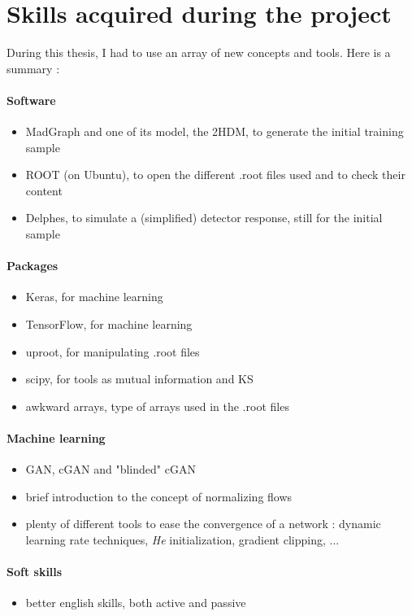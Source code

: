 \section{Skills acquired during the project}

During this thesis, I had to use an array of new concepts and tools. Here is a summary :

\paragraph{Software}
\begin{itemize}
    \item MadGraph and one of its model, the 2HDM, to generate the initial training sample
    \item ROOT (on Ubuntu), to open the different .root files used and to check their content
    \item Delphes, to simulate a (simplified) detector response, still for the initial sample
\end{itemize}

\paragraph{Packages}
\begin{itemize}
    \item Keras, for machine learning
    \item TensorFlow, for machine learning
    \item uproot, for manipulating .root files
    \item scipy, for tools as mutual information and KS
    \item awkward arrays, type of arrays used in the .root files
\end{itemize}

\paragraph{Machine learning}
\begin{itemize}
    \item GAN, cGAN and "blinded" cGAN
    \item brief introduction to the concept of normalizing flows
    \item plenty of different tools to ease the convergence of a network : dynamic learning rate techniques, \textit{He} initialization, gradient clipping, ...
\end{itemize}

\paragraph{Soft skills}
\begin{itemize}
    \item better english skills, both active and passive
\end{itemize}